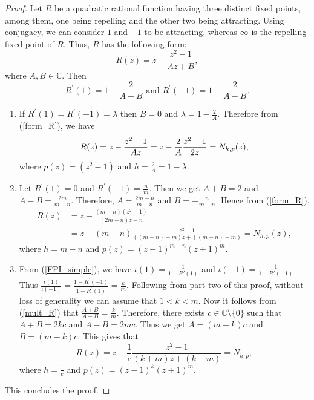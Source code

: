 \documentclass[10pt,a4paper]{amsart}
\begin{document}
\begin{proof}
Let $R$ be a quadratic rational function having three distinct fixed points, among them, one being repelling and the other two being attracting. Using conjugacy, we can consider $ 1 $ and $ -1 $ to be attracting, whereas $\infty$ is the repelling fixed point of $R$. Thus, $R$ has the following form:
\begin{equation}\label{form_R}
R(z)=z-\frac{z^{2}-1}{A z+B},
\end{equation}
where $A, B \in \mathbb{C}$. Then
\begin{equation}\label{mult_R}
R^{\prime}(1)=1-\frac{2}{A+B} \text { and } R^{\prime}(-1)=1-\frac{2}{A-B}.
\end{equation}
\begin{enumerate}
	\item If $R^{\prime}(1)=R^{\prime}(-1)=\lambda$ then $B=0$ and $\lambda=1-\frac{2}{A}$.
Therefore from (\ref{form_R}), we have
$$R(z) =z-\frac{z^{2}-1}{A z}=z-\frac{2}{A} \frac{z^{2}-1}{2 z} \\
=N_{h, p}(z),$$
where $p(z)=\left(z^{2}-1\right)$ and $h=\frac{2}{A}=1-\lambda$.
\item  Let $R^{\prime}(1)=0$
and $R^{\prime}(-1)=\frac{n}{m}$. Then we get $A+B=2$ and $A-B=\frac{2 m}{m-n}$.
Therefore, $A=\frac{2 m-n}{m-n}$ and $B=-\frac{n}{m-n}$.
Hence from (\ref{form_R}),
$$
\begin{aligned}
R(z) & =z-\frac{(m-n)\left(z^{2}-1\right)}{(2 m-n) z-n} \\
& =z-(m-n) \frac{z^{2}-1}{((m-n)+m) z+((m-n)-m)} =N_{h, p}(z),
\end{aligned}
$$
where $h=m-n$ and $p(z)=(z-1)^{m-n}(z+1)^{m}$.
\item  From (\ref{FPI_simple}), we have $\iota(1)=\frac{1}{1-R'(1)}$ and $\iota(-1)=\frac{1}{1-R'(-1)}$. Thus $\frac{\iota(1)}{\iota(-1)}=\frac{1-R^{\prime}(-1)}{1-R^{\prime}(1)}=\frac{k}{m}$. Following from part two of this proof, without loss of generality we can assume that $1<k<m$. Now it follows from (\ref{mult_R}) that
$\frac{A+B}{A-B}=\frac{k}{m}.$
Therefore, there exists $c \in \mathbb{C} \setminus \{0\}$ such that $A+B=2 k c$ and $A-B=2 m c$. Thus we get $A=(m+k) c$ and $B=(m-k) c$. This gives that $$R(z)=z-\frac{1}{c} \frac{z^{2}-1}{(k+m) z+(k-m)}=N_{h, p},$$
 where $h=\frac{1}{c}$ and $p(z)=(z-1)^{k}(z+1)^{m}$.
\end{enumerate}
This concludes the proof.
\end{proof}
\end{document}
